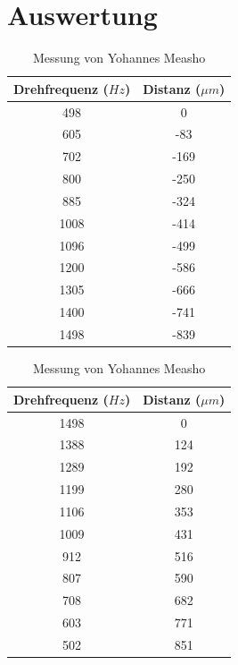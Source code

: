 \section{Auswertung}

\begin{table}[H]
    \caption{Distanzmessungen bei Inkrementieren der Drehfrequenz}
    \begin{subtable}{.5\linewidth}
        \centering
        \caption{Messung von Alex Murray}
        \begin{tabular}{cc}
            \toprule
            Drehfrequenz ($Hz$) & Distanz ($\mu m$) \\
            \midrule
            498  & 0    \\
            605  & -83  \\
            702  & -169 \\
            800  & -250 \\
            885  & -324 \\
            1008 & -414 \\
            1096 & -499 \\
            1200 & -586 \\
            1305 & -666 \\
            1400 & -741 \\
            1498 & -839 \\
            \bottomrule
        \end{tabular}
    \end{subtable}
    \begin{subtable}{.5\linewidth}
        \centering
        \caption{Messung von Yohannes Measho}
        \begin{tabular}{cc}
            \toprule
            Drehfrequenz ($Hz$) & Distanz ($\mu m$) \\
            \midrule
            1498 & 0   \\
            1388 & 124 \\
            1289 & 192 \\
            1199 & 280 \\
            1106 & 353 \\
            1009 & 431 \\
            912  & 516 \\
            807  & 590 \\
            708  & 682 \\
            603  & 771 \\
            502  & 851 \\
            \bottomrule
        \end{tabular}
    \end{subtable}
\end{table}

